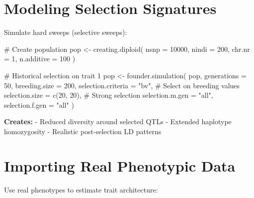 \documentclass[
  letterpaper,
]{book}
\newenvironment{Shaded}{\begin{snugshade}}{\end{snugshade}}
\newcommand{\AttributeTok}[1]{\textcolor[rgb]{0.40,0.45,0.13}{#1}}
\newcommand{\CommentTok}[1]{\textcolor[rgb]{0.37,0.37,0.37}{#1}}
\newcommand{\DecValTok}[1]{\textcolor[rgb]{0.68,0.00,0.00}{#1}}
\newcommand{\FunctionTok}[1]{\textcolor[rgb]{0.28,0.35,0.67}{#1}}
\newcommand{\NormalTok}[1]{\textcolor[rgb]{0.00,0.23,0.31}{#1}}
\newcommand{\OtherTok}[1]{\textcolor[rgb]{0.00,0.23,0.31}{#1}}
\newcommand{\StringTok}[1]{\textcolor[rgb]{0.13,0.47,0.30}{#1}}
\begin{document}
\section{Modeling Selection Signatures}\label{sec-selection-signatures}

Simulate hard sweeps (selective sweeps):

\begin{Shaded}
\begin{Highlighting}[]
\CommentTok{\# Create population}
\NormalTok{pop }\OtherTok{\textless{}{-}} \FunctionTok{creating.diploid}\NormalTok{(}
  \AttributeTok{nsnp =} \DecValTok{10000}\NormalTok{,}
  \AttributeTok{nindi =} \DecValTok{200}\NormalTok{,}
  \AttributeTok{chr.nr =} \DecValTok{1}\NormalTok{,}
  \AttributeTok{n.additive =} \DecValTok{100}
\NormalTok{)}

\CommentTok{\# Historical selection on trait 1}
\NormalTok{pop }\OtherTok{\textless{}{-}} \FunctionTok{founder.simulation}\NormalTok{(}
\NormalTok{  pop,}
  \AttributeTok{generations =} \DecValTok{50}\NormalTok{,}
  \AttributeTok{breeding.size =} \DecValTok{200}\NormalTok{,}
  \AttributeTok{selection.criteria =} \StringTok{"bv"}\NormalTok{,     }\CommentTok{\# Select on breeding values}
  \AttributeTok{selection.size =} \FunctionTok{c}\NormalTok{(}\DecValTok{20}\NormalTok{, }\DecValTok{20}\NormalTok{),    }\CommentTok{\# Strong selection}
  \AttributeTok{selection.m.gen =} \StringTok{"all"}\NormalTok{,}
  \AttributeTok{selection.f.gen =} \StringTok{"all"}
\NormalTok{)}
\end{Highlighting}
\end{Shaded}

\textbf{Creates:} - Reduced diversity around selected QTLs - Extended
haplotype homozygosity - Realistic post-selection LD patterns

\section{Importing Real Phenotypic Data}\label{sec-import-pheno}

Use real phenotypes to estimate trait architecture:
\end{document}
